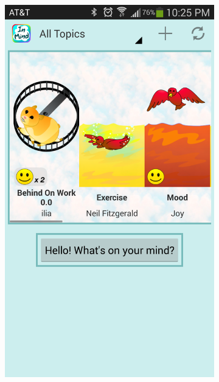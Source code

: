     \begin{figure}
      \caption{\textbf{Main View} --
          (a) The main view has a sliding window of topics.
          Topic icons are prominently displayed,
          as are the topic titles and owners.
          Topics that have updates are highlighted with a yellow glow.
          (b) Since there can many topics shared withi the group,
          the main view has filters that can show a subset of the topics.
          (c) Users can make their own collections to sort topics
          the way they want to.}
      \centering
      \begin{subfigure}[b]{0.3\textwidth}
        \includegraphics[width=\textwidth]{home_view.png}

\end{subfigure}
\end{figure}

